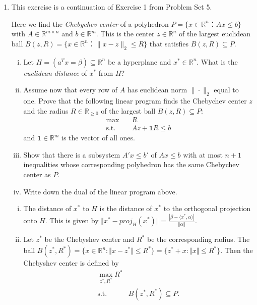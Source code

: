 \documentclass[11pt]{article}
\institute{\'Ecole Polytechnique F\'ed\'erale de Lausanne}
\newcommand{\setR}{\mathbb{R}}
\renewcommand{\leq}{\leqslant}
\begin{document}
\makeheader

\begin{enumerate}[1)]

\item This exercise is a continuation of Exercise 1 from Problem Set 5.  

Here we find  the \emph{Chebychev center} of a polyhedron $P = \{x ∈ ℝ^n ：Ax ≤ b\}$ with $A ∈ ℝ^{m ×n}$ and $b ∈ ℝ^m$. This is the center $z ∈ ℝ^n$  of the largest euclidean ball $B(z,R) = \{ x ∈ ℝ^n ： \| x - z \|_2 ≤ R\}$ that satisfies $B(z,R) ⊆ P$.
  \begin{enumerate}[i)]
  \item Let $H = (a^T x = β) ⊆  ℝ^n$ be a hyperplane and $x^*∈ ℝ^n$. What is the \emph{euclidean distance} of $x^*$ from $H$?
  \item
    Assume now that every row of $A$ has euclidean norm $\|⋅\|_2$ equal to one.  
    Prove that the following linear program finds the Chebychev center $z$ and the radius $R ∈ ℝ_{≥0}$  of the largest ball $B(z,R) ⊆ P$:
      \begin{align*}
        \max & \quad R \\
        \text{s.t.} & \quad A z +  \mathbf{1} R ≤ b
      \end{align*}
   and $\mathbf{1}∈ ℝ^m$ is the vector of all ones.
  \item Show that there is a subsystem $A'x ≤ b'$ of $Ax≤b$ with at most $n+1$ inequalities whose corresponding polyhedron has the same Chebychev center as $P$.
  \item Write down the dual of the linear program above. 
  \end{enumerate}

\begin{solution}
\begin{enumerate}[i)]
\item The distance of $x^\ast$ to $H$ is the distance of $x^\ast$ to the orthogonal projection onto $H$. This is given by $\Vert x^\ast - proj_H(x^\ast)\Vert = \frac{|\beta - \langle x^\ast, \alpha\rangle|}{\Vert \alpha\Vert}$. 

\item Let $z^\ast$ be the Chebyshev center and $R^\ast$ be the corresponding radius. The ball $B(z^\ast, R^\ast) = \{x \in \setR^n: \Vert x- z^\ast \Vert \leq R^\ast \} = \{z^\ast + x : \Vert x \Vert \leq R^\ast\}.$ Then the Chebyshev center is defined by 
\begin{align*}
\max_{z^\ast, R^\ast} R^\ast &\\
\text{s.t. } & B(z^\ast, R^\ast) \subseteq P.
\end{align*}


\end{enumerate}
\end{solution}
\end{enumerate}
\end{document}
